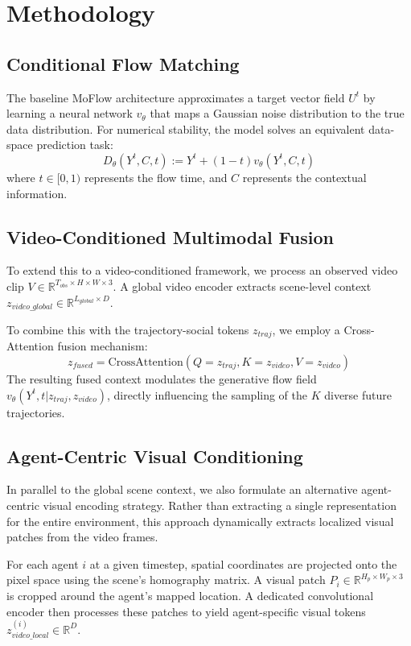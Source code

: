 \section{Methodology}

\subsection{Conditional Flow Matching}
The baseline MoFlow architecture approximates a target vector field $U^t$ by learning a neural network $v_\theta$ that maps a Gaussian noise distribution to the true data distribution. For numerical stability, the model solves an equivalent data-space prediction task:
\begin{equation}
    D_\theta(Y^t, C, t) := Y^t + (1-t)v_\theta(Y^t, C, t)
\end{equation}
where $t \in [0, 1)$ represents the flow time, and $C$ represents the contextual information.

\subsection{Video-Conditioned Multimodal Fusion}
To extend this to a video-conditioned framework, we process an observed video clip $V \in \mathbb{R}^{T_{obs} \times H \times W \times 3}$. A global video encoder extracts scene-level context $z_{video\_global} \in \mathbb{R}^{L_{global} \times D}$. 

To combine this with the trajectory-social tokens $z_{traj}$, we employ a Cross-Attention fusion mechanism:
\begin{equation}
    z_{fused} = \text{CrossAttention}(Q=z_{traj}, K=z_{video}, V=z_{video})
\end{equation}
The resulting fused context modulates the generative flow field $v_\theta(Y^t, t | z_{traj}, z_{video})$, directly influencing the sampling of the $K$ diverse future trajectories.

\subsection{Agent-Centric Visual Conditioning}
In parallel to the global scene context, we also formulate an alternative agent-centric visual encoding strategy. Rather than extracting a single representation for the entire environment, this approach dynamically extracts localized visual patches from the video frames. 

For each agent $i$ at a given timestep, spatial coordinates are projected onto the pixel space using the scene's homography matrix. A visual patch $P_i \in \mathbb{R}^{H_p \times W_p \times 3}$ is cropped around the agent's mapped location. A dedicated convolutional encoder then processes these patches to yield agent-specific visual tokens $z_{video\_local}^{(i)} \in \mathbb{R}^{D}$. 

